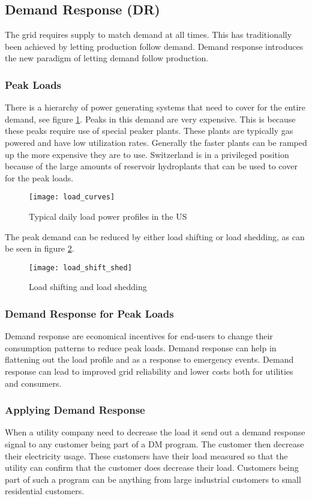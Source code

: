 \subsection{Demand Response (DR)}
The grid requires supply to match demand at all times.
This has traditionally been achieved by letting production follow demand.
Demand response introduces the new paradigm of letting demand follow production.

\subsubsection{Peak Loads}
There is a hierarchy of power generating systems that need to cover for the entire demand, see figure \ref{fig:load_curves}.
Peaks in this demand are very expensive.
This is because these peaks require use of special peaker plants.
These plants are typically gas powered and have low utilization rates.
Generally the faster plants can be ramped up the more expensive they are to use.
Switzerland is in a privileged position because of the large amounts of reservoir hydroplants that can be used to cover for the peak loads.\\

\begin{figure}
    \centering
    \texttt{[image: load\_curves]}
    \caption{Typical daily load power profiles in the US}
    \label{fig:load_curves}
\end{figure}

The peak demand can be reduced by either load shifting or load shedding, as can be seen in figure \ref{fig:load_shift_shed}.

\begin{figure}
    \centering
    \texttt{[image: load\_shift\_shed]}
    \caption{Load shifting and load shedding}
    \label{fig:load_shift_shed}
\end{figure}

\subsubsection{Demand Response for Peak Loads}
Demand response are economical incentives for end-users to change their consumption patterns to reduce peak loads.
Demand response can help in flattening out the load profile and as a response to emergency events.
Demand response can lead to improved grid reliability and lower costs both for utilities and consumers.

\subsubsection{Applying Demand Response}
When a utility company need to decrease the load it send out a demand response signal to any customer being part of a DM program.
The customer then decrease their electricity usage.
These customers have their load measured so that the utility can confirm that the customer does decrease their load.
Customers being part of such a program can be anything from large industrial customers to small residential customers.\\

